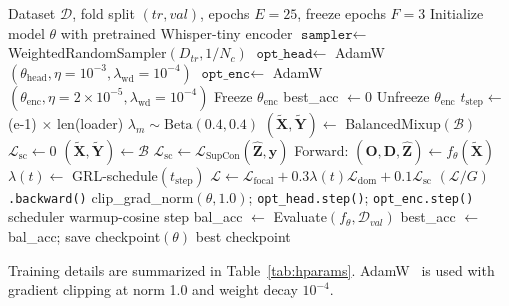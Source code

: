 \documentclass[10pt,journal,compsoc]{IEEEtran}
\begin{document}
\begin{algorithm}[!t]
\caption{CoughSense Training Loop (Single Fold)}
\label{alg:training}
\begin{algorithmic}[1]
\REQUIRE Dataset $\mathcal{D}$, fold split $(tr, val)$, epochs $E=25$,
         freeze epochs $F=3$
\STATE Initialize model $\theta$ with pretrained Whisper-tiny encoder
\STATE $\texttt{sampler} \leftarrow$ WeightedRandomSampler$(D_{tr}, 1/N_c)$
\STATE $\texttt{opt\_head} \leftarrow$ AdamW$(\theta_\mathrm{head},
       \eta=10^{-3}, \lambda_\mathrm{wd}=10^{-4})$
\STATE $\texttt{opt\_enc} \leftarrow$ AdamW$(\theta_\mathrm{enc},
       \eta=2\times10^{-5}, \lambda_\mathrm{wd}=10^{-4})$
\STATE Freeze $\theta_\mathrm{enc}$
\STATE best\_acc $\leftarrow 0$
    \STATE Unfreeze $\theta_\mathrm{enc}$  
  \ENDIF
  \STATE $t_\mathrm{step} \leftarrow$ (e-1) $\times$ len(loader)
    \STATE $\lambda_m \sim \mathrm{Beta}(0.4, 0.4)$
      \STATE $(\tilde{\mathbf{X}}, \tilde{\mathbf{Y}}) \leftarrow$
             BalancedMixup$(\mathcal{B})$
      \STATE $\mathcal{L}_\mathrm{sc} \leftarrow 0$ 
    \ELSE
      \STATE $(\tilde{\mathbf{X}}, \tilde{\mathbf{Y}}) \leftarrow \mathcal{B}$
      \STATE $\mathcal{L}_\mathrm{sc} \leftarrow \mathcal{L}_\mathrm{SupCon}(
             \hat{\mathbf{Z}}, \mathbf{y})$
    \ENDIF
    \STATE Forward: $(\mathbf{O}, \mathbf{D}, \hat{\mathbf{Z}}) \leftarrow f_\theta(\tilde{\mathbf{X}})$
    \STATE $\lambda(t) \leftarrow$ GRL-schedule$(t_\mathrm{step})$
    \STATE $\mathcal{L} \leftarrow \mathcal{L}_\mathrm{focal} +
           0.3\lambda(t)\mathcal{L}_\mathrm{dom} + 0.1\mathcal{L}_\mathrm{sc}$
    \STATE $(\mathcal{L} / G)$\texttt{.backward()}
      \STATE clip\_grad\_norm$(\theta, 1.0)$;
             \texttt{opt\_head.step()}; \texttt{opt\_enc.step()}
      \STATE scheduler warmup-cosine step
    \ENDIF
  \ENDFOR
  \STATE bal\_acc $\leftarrow$ Evaluate$(f_\theta, \mathcal{D}_{val})$
    \STATE best\_acc $\leftarrow$ bal\_acc;
           save checkpoint$(\theta)$
  \ENDIF
\ENDFOR
\RETURN best checkpoint
\end{algorithmic}
\end{algorithm}

Training details are summarized in Table~\ref{tab:hparams}.
AdamW~\cite{adamw} is used with gradient clipping at norm 1.0 and
weight decay $10^{-4}$.
\end{document}

